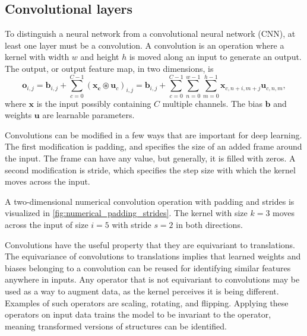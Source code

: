 \subsection{Convolutional layers}
To distinguish a neural network from a convolutional neural network (CNN), at least one layer must be a convolution.
A convolution is an operation where a kernel with width $w$ and height $h$ is moved along an input to generate an output.
The output, or output feature map, in two dimensions, is
\begin{equation}
    \mathbf{o}_{i,j} = \mathbf{b}_{i,j} + \sum_{c=0}^{C-1}(\mathbf{x_c} \circledast \mathbf{u}_c)_{i,j}
    = \mathbf{b}_{i,j} + \sum_{c=0}^{C-1}\sum_{n=0}^{w-1}\sum_{m=0}^{h-1}\mathbf{x}_{c,n+i,m+j}\mathbf{u}_{c,n,m},
\end{equation}
where $\mathbf{x}$ is the input possibly containing $C$ multiple channels.
The bias $\mathbf{b}$ and weights $\mathbf{u}$ are learnable parameters.

Convolutions can be modified in a few ways that are important for deep learning.
The first modification is padding, and specifies the size of an added frame around the input.
The frame can have any value, but generally, it is filled with zeros.
A second modification is stride, which specifies the step size with which the kernel moves across the input.

A two-dimensional numerical convolution operation with padding and strides is visualized in \cref{fig:numerical_padding_strides}.
The kernel with size $k=3$ moves across the input of size $i=5$ with stride $s = 2$ in both directions.

Convolutions have the useful property that they are equivariant to translations.
The equivariance of convolutions to translations implies that learned weights and biases belonging to a convolution can be reused for identifying similar features anywhere in inputs.
Any operator that is not equivariant to convolutions may be used as a way to augment data, as the kernel perceives it is being different.
Examples of such operators are scaling, rotating, and flipping.
Applying these operators on input data trains the model to be invariant to the operator, meaning transformed versions of structures can be identified.

